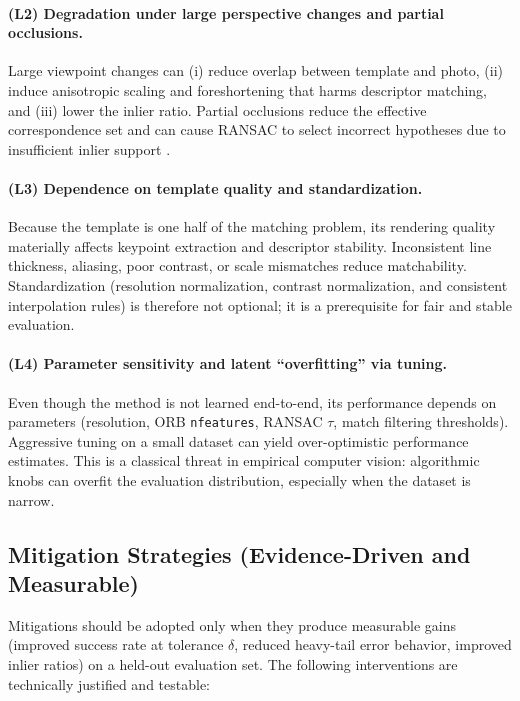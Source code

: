\paragraph{(L2) Degradation under large perspective changes and partial occlusions.}
Large viewpoint changes can (i) reduce overlap between template and photo, (ii) induce anisotropic scaling and foreshortening that harms descriptor matching, and (iii) lower the inlier ratio. Partial occlusions reduce the effective correspondence set and can cause RANSAC to select incorrect hypotheses due to insufficient inlier support \citep{FischlerBolles1981}.

\paragraph{(L3) Dependence on template quality and standardization.}
Because the template is one half of the matching problem, its rendering quality materially affects keypoint extraction and descriptor stability. Inconsistent line thickness, aliasing, poor contrast, or scale mismatches reduce matchability. Standardization (resolution normalization, contrast normalization, and consistent interpolation rules) is therefore not optional; it is a prerequisite for fair and stable evaluation.

\paragraph{(L4) Parameter sensitivity and latent ``overfitting'' via tuning.}
Even though the method is not learned end-to-end, its performance depends on parameters (resolution, ORB \texttt{nfeatures}, RANSAC $\tau$, match filtering thresholds). Aggressive tuning on a small dataset can yield over-optimistic performance estimates. This is a classical threat in empirical computer vision: algorithmic knobs can overfit the evaluation distribution, especially when the dataset is narrow.

\subsection{Mitigation Strategies (Evidence-Driven and Measurable)}
\label{subsec:mitigations}
Mitigations should be adopted only when they produce measurable gains (improved success rate at tolerance $\delta$, reduced heavy-tail error behavior, improved inlier ratios) on a held-out evaluation set. The following interventions are technically justified and testable:

